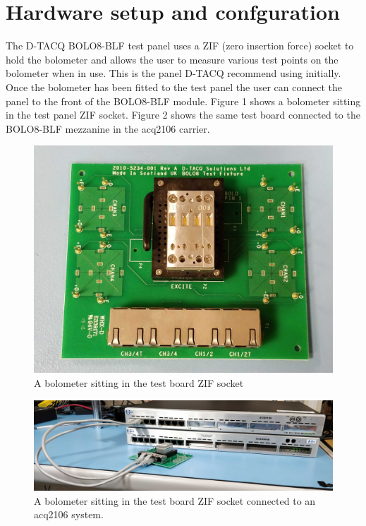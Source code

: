 \documentclass{article}
\begin{document}
\section{Hardware setup and confguration}
The D-TACQ BOLO8-BLF test panel uses a ZIF (zero insertion force) socket to hold the bolometer and allows the user to measure various test points on the bolometer when in use.
This is the panel D-TACQ recommend using initially.
Once the bolometer has been fitted to the test panel the user can connect the panel to the front of the BOLO8-BLF module.
Figure 1 shows a bolometer sitting in the test panel ZIF socket.
Figure 2 shows the same test board connected to the BOLO8-BLF mezzanine in the acq2106 carrier.

\begin{figure}
    \centering
    \includegraphics[width=5.0in]{images/bolo-zif.jpg}
    \caption{A bolometer sitting in the test board ZIF socket}
    \label{boloZIFimage}
\end{figure}

\begin{figure}
	\centering
	\includegraphics[width=5.0in]{images/bolo-zif-connected.jpg}
	\caption{A bolometer sitting in the test board ZIF socket connected to an acq2106 system.}
	\label{boloZIFconnctedImage}
\end{figure}
\end{document}
